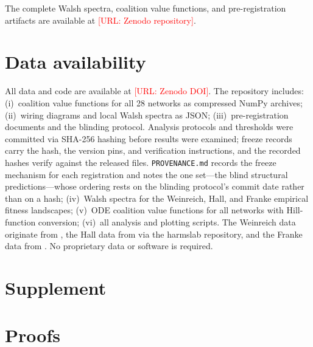 \documentclass[10pt]{article}
\begin{document}
The complete Walsh spectra, coalition value functions, and
pre-registration artifacts are available at
\textcolor{red}{[URL: Zenodo repository]}.


\section*{Data availability}

All data and code are available at \textcolor{red}{[URL: Zenodo DOI]}.
The repository includes: (i)~coalition value functions for all 28
networks as compressed NumPy archives; (ii)~wiring diagrams and local
Walsh spectra as JSON; (iii)~pre-registration documents and the blinding protocol. Analysis
protocols and thresholds were committed via SHA-256 hashing before
results were examined; freeze records carry the hash, the version pins,
and verification instructions, and the recorded hashes verify against
the released files. \texttt{PROVENANCE.md} records the freeze mechanism
for each registration and notes the one set---the blind structural
predictions---whose ordering rests on the blinding protocol's commit
date rather than on a hash; (iv)~Walsh spectra for the Weinreich, Hall, and Franke
empirical fitness landscapes; (v)~ODE coalition value functions for
all networks with Hill-function conversion; (vi)~all analysis and
plotting scripts.
The Weinreich data originate from \citet{weinreich2006darwinian},
the Hall data from \citet{hall2010fitness} via the harmslab
repository, and the Franke data from \citet{franke2011evolutionary}.
No proprietary data or software is required.







\clearpage
\appendix
\renewcommand{\thesection}{S\arabic{section}}
\setcounter{section}{0}
\section*{Supplement}


\section{Proofs}
\label{supp:proofs}
\end{document}
